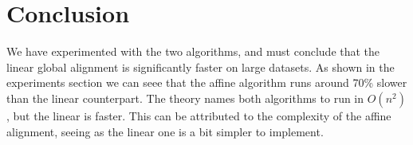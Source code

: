 \section{Conclusion}
We have experimented with the two algorithms, and must conclude that the linear global alignment is significantly faster on large datasets. As shown in the experiments section we can seee that the affine algorithm runs around 70\% slower than the linear counterpart. The theory names both algorithms to run in $O(n^{2})$, but the linear is faster. This can be attributed to the complexity of the affine alignment, seeing as the linear one is a bit simpler to implement. 